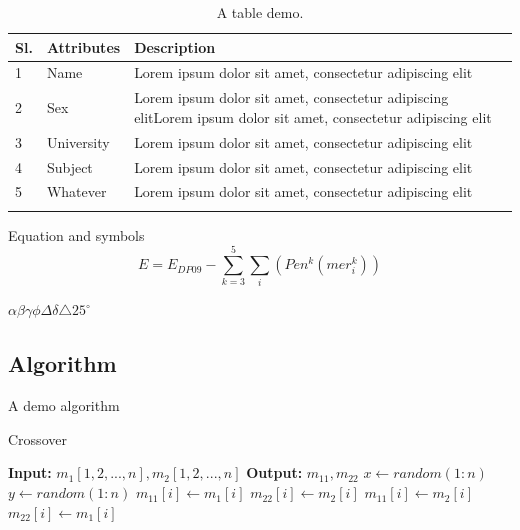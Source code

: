 \begin{table}
	\caption{A table demo.}
	\begin{center}

		\begin{tabular}{p{1cm} p{2.5cm} p{10cm}}
			\hline

Sl.	&	Attributes	&	Description	\\

\hline

1	&	Name	&	Lorem ipsum dolor sit amet, consectetur adipiscing elit	\\
2	&	Sex	& Lorem ipsum dolor sit amet, consectetur adipiscing elitLorem ipsum dolor sit amet, consectetur adipiscing elit	\\
3	&	University	&	Lorem ipsum dolor sit amet, consectetur adipiscing elit	\\
4	&	Subject 	&	Lorem ipsum dolor sit amet, consectetur adipiscing elit\\
5	&	Whatever	&	Lorem ipsum dolor sit amet, consectetur adipiscing elit\\

			\noalign{\smallskip}\hline
		\end{tabular}
	\end{center}
	\label{demotable}
\end{table}  


Equation and symbols
\begin{equation}
E = E_{DP09} - \sum_{k=3}^5 \sum_i(Pen^k(mer_i^k))
\end{equation}

$\alpha \beta \gamma \phi \Delta \delta \triangle 25^{\circ} $

\subsection{Algorithm}

A demo algorithm
\begin{algorithm}
\caption{Crossover}
\label{algoCrossover}
\begin{algorithmic}[1]
    \State \textbf{Input:} $m_1[1, 2,..., n], m_2[1, 2,..., n]$
    \State \textbf{Output:} $m_{11}, m_{22}$
    \State $x \gets random(1:n)$
    \State $y \gets random(1:n)$
            \State $m_{11}[i] \gets m_1[i]$
            \State $m_{22}[i] \gets m_2[i]$
            \State $m_{11}[i] \gets m_2[i]$
            \State $m_{22}[i] \gets m_1[i]$
        \EndIf
    \EndFor
    
\end{algorithmic}
\end{algorithm}